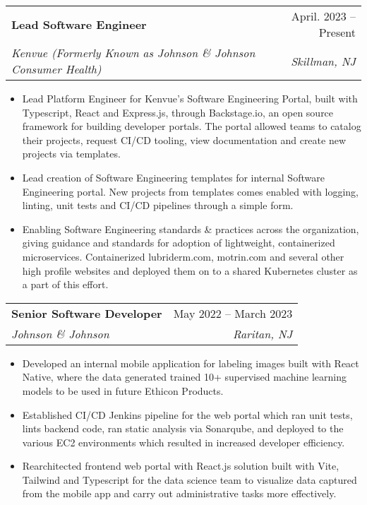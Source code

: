 \documentclass[letterpaper,11pt]{article}
\makeatletter
\newcommand{\resumeItem}[1]{
  \item\small{
    {#1 \vspace{-2pt}}
  }
}
\newcommand{\resumeSubheading}[4]{
  \vspace{-2pt}\item
    \begin{tabular*}{0.95\textwidth}[t]{l@{\extracolsep{\fill}}r}
      \textbf{#1} & #2 \\
      \textit{\small#3} & \textit{\small #4} \\
    \end{tabular*}\vspace{-7pt}
}
\newcommand{\resumeItemListStart}{\begin{itemize}}
\newcommand{\resumeItemListEnd}{\end{itemize}\vspace{-5pt}}
\makeatother
\begin{document}
    \resumeSubheading
      {Lead Software Engineer}{April. 2023 -- Present}
      {Kenvue (Formerly Known as Johnson \& Johnson Consumer Health)}{Skillman, NJ}
      \resumeItemListStart
        \resumeItem{Lead Platform Engineer for Kenvue's Software Engineering Portal, built with Typescript, React and Express.js, through Backstage.io, an open source framework for building developer portals. The portal allowed teams to catalog their projects, request CI/CD tooling, view documentation and create new projects via templates. }
        \resumeItem{Lead creation of Software Engineering templates for internal Software Engineering portal. New projects from templates comes enabled with logging, linting, unit tests and CI/CD pipelines through a simple form.}
        \resumeItem{Enabling Software Engineering standards \& practices across the organization, giving guidance and standards for adoption of lightweight, containerized microservices. Containerized lubriderm.com, motrin.com and several other high profile websites and deployed them on to a shared Kubernetes cluster as a part of this effort. }
    \resumeItemListEnd

    \resumeSubheading
      {Senior Software Developer}{May 2022 -- March 2023}
      {Johnson \& Johnson}{Raritan, NJ}
      \resumeItemListStart
        \resumeItem{Developed an internal mobile application for labeling images built with React Native, where the data generated trained 10+ supervised machine learning models to be used in future Ethicon Products.}
        \resumeItem{Established CI/CD Jenkins pipeline for the web portal which ran unit tests, lints backend code, ran static analysis via
Sonarqube, and deployed to the various EC2 environments which resulted in increased developer efficiency.}
        \resumeItem{Rearchitected frontend web portal with React.js solution built with Vite, Tailwind and Typescript for the data science
team to visualize data captured from the mobile app and carry out administrative tasks more effectively.}
      \resumeItemListEnd
\end{document}

